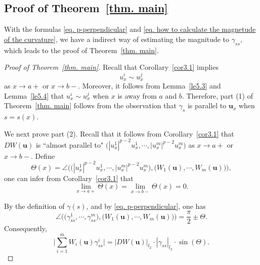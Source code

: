 \documentclass[11pt,twoside,reqno]{amsart}
\numberwithin{equation}{section}
\begin{document}
\subsection{Proof of Theorem~\ref{thm. main}}
With the formulas \eqref{eq. p-perpendicular} and \eqref{eq. how to calculate the magnetude of the curvature}, we have a indirect way of estimating the magnitude to $\gamma_{ss}$, which leads to the proof of Theorem~\ref{thm. main}.
\begin{proof}[Proof of Theorem~\ref{thm. main}]
Recall that Corollary~\ref{cor3.1} implies
\[
u^{i}_{x}\sim u^{j}_{x}
\]
as $x\to a+$ or $x\to b-$. Moreover, it follows from Lemma~\ref{le5.3} and Lemma~\ref{le5.4} that $u^{i}_{x}\sim u^{j}_{x}$ when $x$ is away from $a$ and $b$. Therefore, part (1) of Theorem~\ref{thm. main} follows from the observation that $\gamma_{s}$ is parallel to $\mathbf{u}_{x}$ when $s=s(x)$.

We next prove part (2). Recall that it follows from Corollary~\ref{cor3.1} that $DW(\mathbf{u})$ is ``almost parallel to" $\big(|u^{1}_{x}|^{p-2}u^{1}_{x},\cdots,|u^{m}_{x}|^{p-2}u^{m}_{x}\big)$ as $x\to a+$ or $x\to b-$. Define
\begin{equation*}
    \Theta(x)=\angle{\Big(\big(|u^{1}_{x}|^{p-2}u^{1}_{x},\cdots,|u^{m}_{x}|^{p-2}u^{m}_{x}\big),\big(W_{1}(\mathbf{u}),\cdots,W_{m}(\mathbf{u})\big)\Big)},
\end{equation*}
one can infer from Corollary~\ref{cor3.1} that
\begin{equation}\label{eq. Theta to 0}
    \lim_{x\to a+}\Theta(x)=\lim_{x\to b-}\Theta(x)=0.
\end{equation}

By the definition of $\gamma(s)$, and by \eqref{eq. p-perpendicular}, one has
\begin{equation*}
    \angle{\Big(\big(\gamma^{1}_{ss},\cdots,\gamma^{m}_{ss}\big),\big(W_{1}(\mathbf{u}),\cdots,W_{m}(\mathbf{u})\big)\Big)}=\frac{\pi}{2}\pm\Theta.
\end{equation*}
Consequently,
\begin{equation}\label{eq. cosine rule}
    \Big|\sum_{i=1}^{m}W_{i}(\mathbf{u})\gamma^{i}_{ss}\Big|=|DW(\mathbf{u})|_{l_{2}}\cdot|\gamma_{ss}|_{l_{2}}\cdot\sin{(\Theta)}.
\end{equation}


\end{proof}
\end{document}
